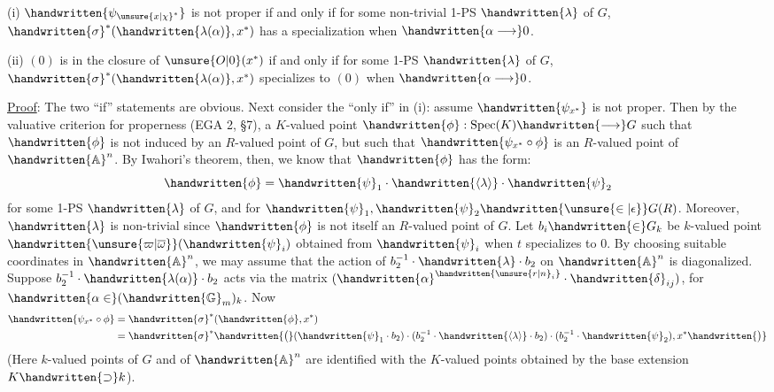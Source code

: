 (i) $\handwritten{\psi_{{\unsure{x|\chi}}^*}}$ is not proper if and only if for some non-trivial 1-PS $\handwritten{\lambda}$ of $G$, $\handwritten{\sigma}^*(\handwritten{\lambda(\alpha)},x^*)$ has a specialization when $\handwritten{\alpha\longrightarrow}0$.

(ii) $(0)$ is in the closure of $\unsure{O|0}(x^*)$ if and only if for some 1-PS $\handwritten{\lambda}$ of $G$, $\handwritten{\sigma}^*(\handwritten{\lambda(\alpha)},x^*)$ specializes to $(0)$ when $\handwritten{\alpha\longrightarrow}0$.

\uline{Proof}: The two ``if'' statements are obvious. Next consider the ``only if'' in (i): assume $\handwritten{\psi_{x^*}}$ is not proper. Then by the valuative criterion for properness (EGA 2, \S7),  a $K$-valued point $\handwritten{\phi}:\operatorname{Spec}(K)\handwritten{\longrightarrow}G$ such that $\handwritten{\phi}$ is not induced by an $R$-valued point of $G$, but such that $\handwritten{\psi_{x^*}\circ\phi}$ is an $R$-valued point of $\handwritten{\mathbb{A}}^n$. By Iwahori's theorem, then, we know that $\handwritten{\phi}$ has the form:
\[
\handwritten{\phi}=\handwritten{\psi}_1\cdot\handwritten{\langle\lambda\rangle}\cdot\handwritten{\psi}_2
\]
for some 1-PS $\handwritten{\lambda}$ of $G$, and for $\handwritten{\psi}_1,\handwritten{\psi}_2\handwritten{\unsure{\in|\epsilon}}G(R)$. Moreover, $\handwritten{\lambda}$ is non-trivial since $\handwritten{\phi}$ is not itself an $R$-valued point of $G$. Let $b_i\handwritten{\in}G_k$ be $k$-valued point $\handwritten{\unsure{\varpi|\overline{\omega}}}(\handwritten{\psi}_i)$ obtained from $\handwritten{\psi}_i$ when $t$ specializes to $0$. By choosing suitable coordinates in $\handwritten{\mathbb{A}}^n$, we may assume that the action of $b_2^{-1}\cdot\handwritten{\lambda}\cdot b_2$ on $\handwritten{\mathbb{A}}^n$ is diagonalized. Suppose $b_2^{-1}\cdot\handwritten{\lambda(\alpha)}\cdot b_2$ acts via the matrix $(\handwritten{\alpha}^{\handwritten{\unsure{r|n}_i}}\cdot\handwritten{\delta}_{ij})$, for $\handwritten{\alpha\in}(\handwritten{\mathbb{G}}_m)_k$. Now
\[
\begin{aligned}
\handwritten{\psi_{x^*}\circ\phi}&=\handwritten{\sigma}^*(\handwritten{\phi},x^*)\\
&=\handwritten{\sigma}^*\handwritten{\bigl(}(\handwritten{\psi}_1\cdot b_2)\cdot(b_2^{-1}\cdot\handwritten{\langle\lambda\rangle}\cdot b_2)\cdot(b_2^{-1}\cdot\handwritten{\psi}_2),x^*\handwritten{\bigr)}
\end{aligned}
\]
(Here $k$-valued points of $G$ and of $\handwritten{\mathbb{A}}^n$ are identified with the $K$-valued points obtained by the base extension $K\handwritten{\supset}k$).
